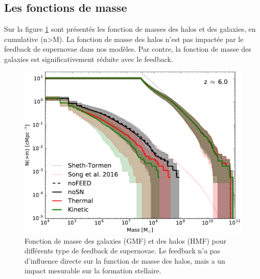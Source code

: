 \subsection{Les fonctions de masse}
\label{sec:hmf}

Sur la figure \ref{fig:ghmf} sont présentés les fonction de masses des halos et des galaxies, en cumulative (n>M).
La fonction de masse des halos n'est pas impactée par le feedback de supernovae dans nos modèles.
Par contre, la fonction de masse des galaxies est significativement réduite avec le feedback.

\begin{figure}
		\includegraphics[width=.95\linewidth]{img/03/ghmf.pdf}
        \caption[Fonctions de masses G/HMF]{Fonction de masse des galaxies (\ac{GMF}) et des halos (\ac{HMF}) pour différents type de feedback de supernovae.
        Le feedback n'a pas d'influence directe sur la function de masse des halos, mais a un impact mesurable sur la formation stellaire.
 		\label{fig:ghmf}}
\end{figure}



